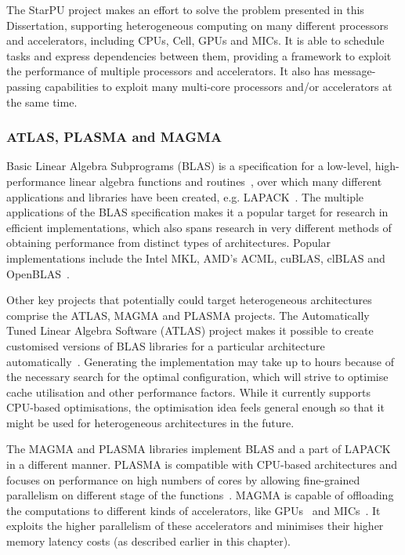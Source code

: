 The StarPU project makes an effort to solve the problem presented in this Dissertation, supporting heterogeneous computing on many different processors and accelerators, including CPUs, Cell, GPUs and MICs. It is able to schedule tasks and express dependencies between them, providing a framework to exploit the performance of multiple processors and accelerators. It also has message-passing capabilities to exploit many multi-core processors and/or accelerators at the same time.

\subsubsection{ATLAS, PLASMA and MAGMA}

Basic Linear Algebra Subprograms (BLAS) is a specification for a low-level, high-performance linear algebra functions and routines~\cite{15_wikipedia_2015}, over which many different applications and libraries have been created, e.g. LAPACK~\cite{anderson1990lapack}. The multiple applications of the BLAS specification makes it a popular target for research in efficient implementations, which also spans research in very different methods of obtaining performance from distinct types of architectures. Popular implementations include the Intel MKL, AMD's ACML, cuBLAS, clBLAS and OpenBLAS~\cite{15_wikipedia_2015}.

Other key projects that potentially could target heterogeneous architectures comprise the ATLAS, MAGMA and PLASMA projects. The Automatically Tuned Linear Algebra Software (ATLAS) project makes it possible to create customised versions of BLAS libraries for a particular architecture automatically~\cite{whaley2001automated}. Generating the implementation may take up to hours because of the necessary search for the optimal configuration, which will strive to optimise cache utilisation and other performance factors. While it currently supports CPU-based optimisations, the optimisation idea feels general enough so that it might be used for heterogeneous architectures in the future.

The MAGMA and PLASMA libraries implement BLAS and a part of LAPACK in a different manner. PLASMA is compatible with CPU-based architectures and focuses on performance on high numbers of cores by allowing fine-grained parallelism on different stage of the functions~\cite{agullo2009numerical}. MAGMA is capable of offloading the computations to different kinds of accelerators, like GPUs~\cite{agullo2009numerical} and MICs~\cite{dongarra2013portable}. It exploits the higher parallelism of these accelerators and minimises their higher memory latency costs (as described earlier in this chapter).

